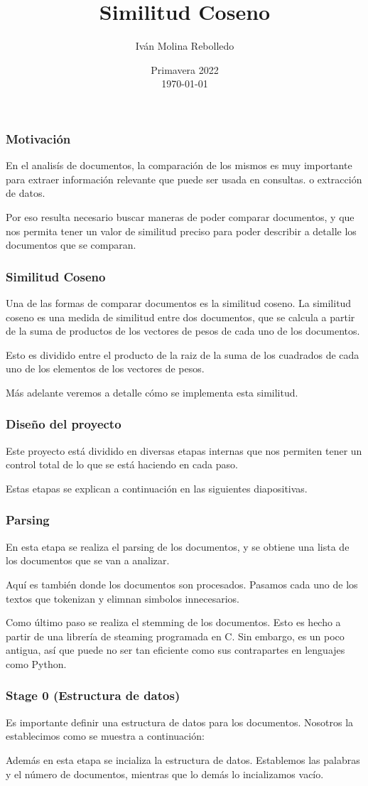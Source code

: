 \documentclass[aspectratio=169]{beamer}
\title{Similitud Coseno}
\author{Iván Molina Rebolledo}
\institute{Benemérita Universidad Autónoma de Puebla}
\date{Primavera 2022\\\today}
\begin{document}
\frame{\titlepage}

\begin{frame}
\frametitle{Motivación}
En el analisís de documentos, la comparación de los mismos es muy importante
para extraer información relevante que puede ser usada en consultas. o
extracción de datos. \pause

Por eso resulta necesario buscar maneras de poder comparar documentos, y
que nos permita tener un valor de similitud preciso para poder describir
a detalle los documentos que se comparan.
\end{frame}

\begin{frame}
\frametitle{Similitud Coseno}
Una de las formas de comparar documentos es la similitud coseno.
La similitud coseno es una medida de similitud entre dos documentos,
que se calcula a partir de la suma de productos de los vectores
de pesos de cada uno de los documentos. \pause

Esto es dividido entre el producto de la raiz de la suma de los cuadrados
de cada uno de los elementos de los vectores de pesos. \pause

Más adelante veremos a detalle cómo se implementa esta similitud.
\end{frame}

\begin{frame}
\frametitle{Diseño del proyecto}
Este proyecto está dividido en diversas etapas internas que nos permiten
tener un control total de lo que se está haciendo en cada paso. \pause

Estas etapas se explican a continuación en las siguientes diapositivas.
\end{frame}

\begin{frame}
\frametitle{Parsing}
En esta etapa se realiza el parsing de los documentos, y se obtiene una
lista de los documentos que se van a analizar. \pause

Aquí es también donde los documentos son procesados. Pasamos cada uno
de los textos que tokenizan y elimnan simbolos innecesarios. \pause

Como último paso se realiza el stemming de los documentos. \pause
Esto es hecho a partir de una librería de steaming programada en
C. \pause Sin embargo, es un poco antigua, así que puede no ser tan
eficiente como sus contrapartes en lenguajes como Python.
\end{frame}

\begin{frame}[fragile]
\frametitle{Stage 0 (Estructura de datos)}
Es importante definir una estructura de datos para los documentos.
Nosotros la establecimos como se muestra a continuación: \pause



Además en esta etapa se incializa la estructura de datos. \pause
Establemos las palabras y el número de documentos, mientras que
lo demás lo incializamos vacío.
\end{frame}
\end{document}
